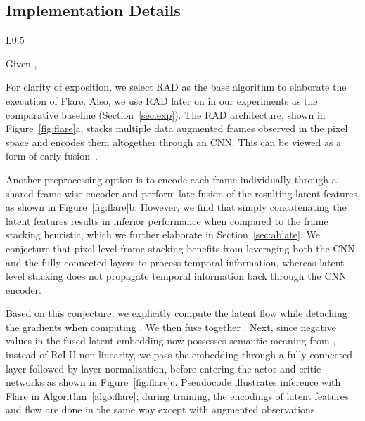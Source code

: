 \documentclass{article} \usepackage{iclr2021_conference,times}
\begin{document}
\subsection{Implementation Details}\label{sec:archit}
\begin{wrapfigure}[13]{L}{0.5\textwidth} \begin{algorithm}[H]                

      \caption{Pixel-based Flare Inference}\label{algo:flare}
       Given , \;
       {
       \;
       \;
       \;
       \;
       \;
       \;
}
  \end{algorithm}

\end{wrapfigure}
For clarity of exposition, we select RAD as the base algorithm to elaborate the execution of Flare. Also, we use RAD later on in our experiments as the comparative baseline (Section~\ref{sec:exp}). The RAD architecture, shown in Figure~\ref{fig:flare}a, stacks multiple data augmented frames observed in the pixel space and encodes them altogether through an CNN. This can be viewed as a form of early fusion~\citep{KarpathyVideo}. 

Another preprocessing option is to encode each frame individually through a shared frame-wise encoder and perform late fusion of the resulting latent features, as shown in Figure~\ref{fig:flare}b. However, we find that simply concatenating the latent features results in inferior performance when compared to the frame stacking heuristic, which we further elaborate in Section~\ref{sec:ablate}. We conjecture that pixel-level frame stacking benefits from leveraging both the CNN and the fully connected layers to process temporal information, whereas latent-level stacking does not propagate temporal information back through the CNN encoder. 

Based on this conjecture, we explicitly compute the latent flow  while detaching the  gradients when computing . We then fuse together . Next, since negative values in the fused latent embedding now possesses semantic meaning from , instead of ReLU non-linearity, we pass the embedding through a fully-connected layer followed by layer normalization, before entering the actor and critic networks as shown in Figure~\ref{fig:flare}c. Pseudocode illustrates inference with Flare in Algorithm~\ref{algo:flare}; during training, the encodings of latent features and flow are done in the same way except with augmented observations. 
\end{document}
